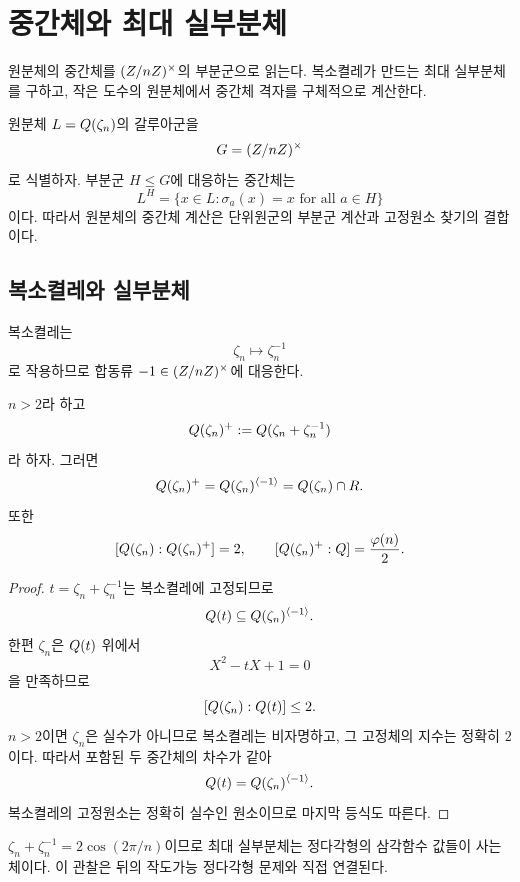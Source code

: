 \clearpage
\section{중간체와 최대 실부분체}
\label{sec:cyclotomic-intermediate-real}

\begin{learninggoal}
원분체의 중간체를 $(Z/nZ)^\times$의 부분군으로 읽는다. 복소켤레가 만드는 최대 실부분체를 구하고, 작은 도수의 원분체에서 중간체 격자를 구체적으로 계산한다.
\end{learninggoal}

원분체 $L=Q(\zeta_n)$의 갈루아군을
\[
  G=(Z/nZ)^\times
\]
로 식별하자. 부분군 $H\le G$에 대응하는 중간체는
\[
  L^H
  =\{x\in L:\sigma_a(x)=x\text{ for all }a\in H\}
\]
이다. 따라서 원분체의 중간체 계산은 단위원군의 부분군 계산과 고정원소 찾기의 결합이다.

\subsection{복소켤레와 실부분체}

복소켤레는
\[
  \zeta_n\longmapsto\zeta_n^{-1}
\]
로 작용하므로 합동류 $-1\in(Z/nZ)^\times$에 대응한다.

\begin{theorem}[최대 실부분체]
\label{thm:maximal-real-cyclotomic-subfield}
$n>2$라 하고
\[
  Q(\zeta_n)^+
  :=Q(\zeta_n+\zeta_n^{-1})
\]
라 하자. 그러면
\[
  Q(\zeta_n)^+
  =Q(\zeta_n)^{\langle-1\rangle}
  =Q(\zeta_n)\cap R.
\]
또한
\[
  [Q(\zeta_n):Q(\zeta_n)^+]=2,
  \qquad
  [Q(\zeta_n)^+:Q]=\frac{\varphi(n)}2.
\]
\end{theorem}

\begin{proof}
$t=\zeta_n+\zeta_n^{-1}$는 복소켤레에 고정되므로
\[
  Q(t)\subseteq Q(\zeta_n)^{\langle-1\rangle}.
\]
한편 $\zeta_n$은 $Q(t)$ 위에서
\[
  X^2-tX+1=0
\]
을 만족하므로
\[
  [Q(\zeta_n):Q(t)]\le2.
\]
$n>2$이면 $\zeta_n$은 실수가 아니므로 복소켤레는 비자명하고, 그 고정체의 지수는 정확히 $2$이다. 따라서 포함된 두 중간체의 차수가 같아
\[
  Q(t)=Q(\zeta_n)^{\langle-1\rangle}.
\]
복소켤레의 고정원소는 정확히 실수인 원소이므로 마지막 등식도 따른다.
\end{proof}

\begin{remark}
$\zeta_n+\zeta_n^{-1}=2\cos(2\pi/n)$이므로 최대 실부분체는 정다각형의 삼각함수 값들이 사는 체이다. 이 관찰은 뒤의 작도가능 정다각형 문제와 직접 연결된다.
\end{remark}


